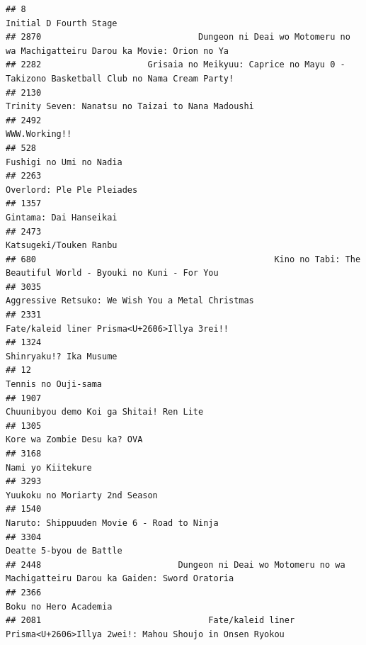 \documentclass[
]{article}
\begin{document}
\begin{verbatim}
## 8                                                                                       Initial D Fourth Stage
## 2870                               Dungeon ni Deai wo Motomeru no wa Machigatteiru Darou ka Movie: Orion no Ya
## 2282                     Grisaia no Meikyuu: Caprice no Mayu 0 - Takizono Basketball Club no Nama Cream Party!
## 2130                                                         Trinity Seven: Nanatsu no Taizai to Nana Madoushi
## 2492                                                                                             WWW.Working!!
## 528                                                                                    Fushigi no Umi no Nadia
## 2263                                                                                Overlord: Ple Ple Pleiades
## 1357                                                                                    Gintama: Dai Hanseikai
## 2473                                                                                    Katsugeki/Touken Ranbu
## 680                                               Kino no Tabi: The Beautiful World - Byouki no Kuni - For You
## 3035                                                         Aggressive Retsuko: We Wish You a Metal Christmas
## 2331                                                              Fate/kaleid liner Prisma<U+2606>Illya 3rei!!
## 1324                                                                                    Shinryaku!? Ika Musume
## 12                                                                                         Tennis no Ouji-sama
## 1907                                                                   Chuunibyou demo Koi ga Shitai! Ren Lite
## 1305                                                                               Kore wa Zombie Desu ka? OVA
## 3168                                                                                         Nami yo Kiitekure
## 3293                                                                            Yuukoku no Moriarty 2nd Season
## 1540                                                                Naruto: Shippuuden Movie 6 - Road to Ninja
## 3304                                                                                   Deatte 5-byou de Battle
## 2448                           Dungeon ni Deai wo Motomeru no wa Machigatteiru Darou ka Gaiden: Sword Oratoria
## 2366                                                                                     Boku no Hero Academia
## 2081                                 Fate/kaleid liner Prisma<U+2606>Illya 2wei!: Mahou Shoujo in Onsen Ryokou

\end{verbatim}
\end{document}

